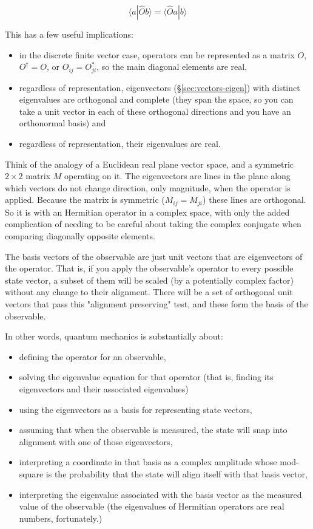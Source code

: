 $$\langle a|\hat{O} b \rangle = \langle \hat{O} a| b \rangle$$

This has a few useful implications:

\begin{itemize}
  \item in the discrete finite vector case, operators can be represented as a matrix $O$, $O^{\dagger} = O$, or $O_{ij} = O_{ji}^*$, so the main diagonal elements are real,
  \item regardless of representation, eigenvectors (§\ref{sec:vectors-eigen}) with distinct eigenvalues are orthogonal and complete (they span the space, so you can take a unit vector in each of these orthogonal directions and you have an orthonormal basis) and
  \item regardless of representation, their eigenvalues are real.
\end{itemize}

Think of the analogy of a Euclidean real plane vector space, and a symmetric $2 \times 2$ matrix $M$ operating on it. The eigenvectors are lines in the plane along which vectors do not change direction, only magnitude, when the operator is applied. Because the matrix is symmetric ($M_{ij} = M_{ji}$) these lines are orthogonal. So it is with an Hermitian operator in a complex space, with only the added complication of needing to be careful about taking the complex conjugate when comparing diagonally opposite elements.

The basis vectors of the observable are just unit vectors that are eigenvectors of the operator. That is, if you apply the observable's operator to every possible state vector, a subset of them will be scaled (by a potentially complex factor) without any change to their alignment. There will be a set of orthogonal unit vectors that pass this "alignment preserving" test, and these form the basis of the observable.

In other words, quantum mechanics is substantially about:

\begin{itemize}
  \item defining the operator for an observable,
  \item solving the eigenvalue equation for that operator (that is, finding its eigenvectors and their associated eigenvalues)
  \item using the eigenvectors as a basis for representing state vectors,
  \item assuming that when the observable is measured, the state will snap into alignment with one of those eigenvectors,
  \item interpreting a coordinate in that basis as a complex amplitude whose mod-square is the probability that the state will align itself with that basis vector,
  \item interpreting the eigenvalue associated with the basis vector as the measured value of the observable (the eigenvalues of Hermitian operators are real numbers, fortunately.)
\end{itemize}

